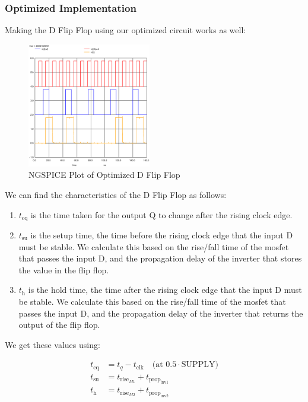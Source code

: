 \documentclass[conference]{IEEEtran}
\begin{document}
\subsubsection{Optimized Implementation}

Making the D Flip Flop using our optimized circuit works as well:

\begin{figure}[H]
    \centering
    \includegraphics[width=0.48\textwidth]{images/d_ff_optimized_tran.eps}
    \caption{NGSPICE Plot of Optimized D Flip Flop}
\end{figure}

We can find the characteristics of the D Flip Flop as follows:

\begin{enumerate}
    \item $t_{\text{cq}}$ is the time taken for the output Q to change after the rising clock edge.
    \item $t_{\text{su}}$ is the setup time, the time before the rising clock edge that the input D must be stable. We calculate this based on the rise/fall time of the mosfet that passes the input D, and the propagation delay of the inverter that stores the value in the flip flop.
    \item $t_{\text{h}}$ is the hold time, the time after the rising clock edge that the input D must be stable. We calculate this based on the rise/fall time of the mosfet that passes the input D, and the propagation delay of the inverter that returns the output of the flip flop.
\end{enumerate}

We get these values using: 

\begin{align}
    t_{\text{cq}} &= t_q - t_{\text{clk}} \quad \text{(at } 0.5 \cdot \text{SUPPLY)} \\
    t_{\text{su}} &= t_{\text{rise}_{M1}} + t_{\text{prop}_{\text{inv1}}} \\
    t_{\text{h}} &= t_{\text{rise}_{M2}} + t_{\text{prop}_{\text{inv2}}}
\end{align}
\end{document}
